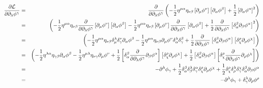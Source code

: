 \begin{eqnarray*}
\frac{\partial \mathcal{L}}{\partial \partial _{\lambda }\phi ^{\gamma }} &=&%
\frac{\partial }{\partial \partial _{\lambda }\phi ^{\gamma }}\left( -\frac{1%
}{2}\eta ^{\mu \alpha }\eta _{\nu \beta }\left[ \partial _{\mu }\phi ^{\nu }%
\right] \left[ \partial _{\alpha }\phi ^{\beta }\right] +\frac{1}{2}\left[
\partial _{\alpha }\phi ^{\alpha }\right] ^{2}\right) \\
&=&\left( -\frac{1}{2}\eta ^{\mu \alpha }\eta _{\nu \beta }\frac{\partial }{%
\partial \partial _{\lambda }\phi ^{\gamma }}\left[ \partial _{\mu }\phi
^{\nu }\right] \left[ \partial _{\alpha }\phi ^{\beta }\right] -\frac{1}{2}%
\eta ^{\mu \alpha }\eta _{\nu \beta }\left[ \partial _{\mu }\phi ^{\nu }%
\right] \frac{\partial }{\partial \partial _{\lambda }\phi ^{\gamma }}\left[
\partial _{\alpha }\phi ^{\beta }\right] +\frac{1}{2}\frac{\partial }{%
\partial \partial _{\lambda }\phi ^{\gamma }}\left[ \delta _{\alpha }^{\beta
}\partial _{\beta }\phi ^{\alpha }\right] ^{2}\right) \\
&=&\left( -\frac{1}{2}\eta ^{\mu \alpha }\eta _{\nu \beta }\delta _{\mu
}^{\lambda }\delta _{\gamma }^{\nu }\partial _{\alpha }\phi ^{\beta }-\frac{1%
}{2}\eta ^{\mu \alpha }\eta _{\nu \beta }\partial _{\mu }\phi ^{\nu }\delta
_{\alpha }^{\lambda }\delta _{\gamma }^{\beta }+\frac{1}{2}\frac{\partial }{%
\partial \partial _{\lambda }\phi ^{\gamma }}\left[ \delta _{\alpha }^{\beta
}\partial _{\beta }\phi ^{\alpha }\right] \left[ \delta _{\chi }^{\rho
}\partial _{\rho }\phi ^{\chi }\right] \right) \\
&=&\left( -\frac{1}{2}\eta ^{\lambda \alpha }\eta _{\gamma \beta }\partial
_{\alpha }\phi ^{\beta }-\frac{1}{2}\eta ^{\mu \lambda }\eta _{\nu \gamma
}\partial _{\mu }\phi ^{\nu }+\frac{1}{2}\left[ \delta _{\alpha }^{\beta }%
\frac{\partial }{\partial \partial _{\lambda }\phi ^{\gamma }}\partial
_{\beta }\phi ^{\alpha }\right] \left[ \delta _{\chi }^{\rho }\partial
_{\rho }\phi ^{\chi }\right] +\frac{1}{2}\left[ \delta _{\alpha }^{\beta
}\partial _{\beta }\phi ^{\alpha }\right] \left[ \delta _{\chi }^{\rho }%
\frac{\partial }{\partial \partial _{\lambda }\phi ^{\gamma }}\partial
_{\rho }\phi ^{\chi }\right] \right) \\
&=&-\partial ^{\lambda }\phi _{\gamma }+\frac{1}{2}\delta _{\alpha }^{\beta
}\delta _{\beta }^{\lambda }\delta _{\gamma }^{\alpha }\delta _{\chi }^{\rho
}\partial _{\rho }\phi ^{\chi }+\frac{1}{2}\delta _{\chi }^{\rho }\delta
_{\rho }^{\lambda }\delta _{\gamma }^{\chi }\delta _{\alpha }^{\beta
}\partial _{\beta }\phi ^{\alpha } \\
&=&-\partial ^{\lambda }\phi _{\gamma }+\delta _{\gamma }^{\lambda }\partial
_{\rho }\phi ^{\rho }
\end{eqnarray*}
